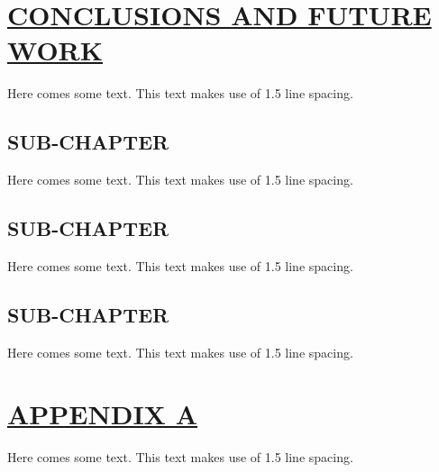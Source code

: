 \documentclass[fontsize=13pt]{scrartcl}
\begin{document}
{{{{{{{\section{\uline{CONCLUSIONS AND FUTURE WORK}}
Here comes some text. This text makes use of 1.5 line spacing. 
\subsection{SUB-CHAPTER}
Here comes some text. This text makes use of 1.5 line spacing. 
\subsection{SUB-CHAPTER}
Here comes some text. This text makes use of 1.5 line spacing. 
\subsection{SUB-CHAPTER}
Here comes some text. This text makes use of 1.5 line spacing.  %
\pagebreak
\section*{\uline{APPENDIX A}}
Here comes some text. This text makes use of 1.5 line spacing. %
\pagebreak
}}}}}}}
\end{document}
